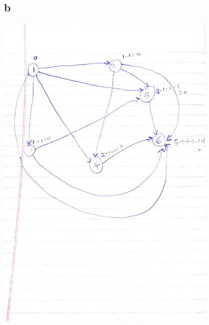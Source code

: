 \documentclass{article}
\begin{document}
\subsection*{b}
\begin{center}
    \includegraphics[width=0.8\textwidth]{toposort2.jpg}
    \newpage

\end{center}
\end{document}
